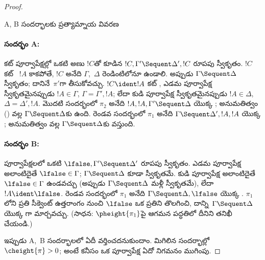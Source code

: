 \documentclass[../../../include/open-logic-section]{subfiles}
\begin{document}
\begin{proof}
\begin{center}
A, B సందర్భాలకు ప్రత్యామ్నాయ వివరణ
\end{center}

\paragraph{సందర్భం A:} కట్ పూర్వాపేక్షల్లో ఒకటి అణు $!C$తో కూడిన $!C, \Gamma' \Sequent \Delta', !C$ రూపపు స్వీకృతం. $!C$ కట్ ~$!A$ కాకపోతే, $!C$ అనేది $\Gamma$,~$\Delta$ రెండింటిలోనూ ఉండాలి. అప్పుడు $\Gamma \Sequent \Delta$ స్వీకృతం; దానినే~$\pi'$గా తీసుకోవచ్చు. $!C \ident !A$ కట్ , ఎడమ పూర్వాపేక్ష స్వీకృతమైనప్పుడు $!A \in \Gamma$, $\Gamma = \Gamma', !A$; లేదా కుడి పూర్వాపేక్ష స్వీకృతమైనప్పుడు $!A \in \Delta$, $\Delta = \Delta', !A$. మొదటి సందర్భంలో $\pi_2$ అనేది $!A, !A, \Gamma' \Sequent \Delta$ యొక్క ; \LeftR{\Contraction} అనుమతిత్వం () వల్ల $\Gamma \Sequent \Delta$కు  ఉంది. రెండవ సందర్భంలో $\pi_1$ అనేది $\Gamma \Sequent \Delta', !A, !A$ యొక్క ; \RightR{\Contraction} అనుమతిత్వం వల్ల $\Gamma \Sequent \Delta$కు  వస్తుంది.

\paragraph{సందర్భం B:} పూర్వాపేక్షలలో ఒకటి $\lfalse, \Gamma' \Sequent \Delta'$ రూపపు స్వీకృతం. ఎడమ పూర్వాపేక్ష అలాంటిదైతే $\lfalse \in \Gamma$; $\Gamma \Sequent \Delta$ కూడా స్వీకృతమే. కుడి పూర్వాపేక్ష అలాంటిదైతే $\lfalse \in \Gamma$ ఉండవచ్చు (అప్పుడు $\Gamma \Sequent \Delta$ మళ్లీ స్వీకృతమే), లేదా $!A \ident \lfalse$. రెండవ సందర్భంలో $\pi_1$ అనేది $\Gamma \Sequent \Delta, \lfalse$ యొక్క . $\pi_1$లోని ప్రతి సీక్వెంట్ ఉత్తరాంగం నుంచి $\lfalse$ ఒక ప్రతిని తొలగించి, దాన్ని~$\Gamma \Sequent \Delta$ యొక్క గా మార్చవచ్చు. (సాధన: $\pheight{\pi_1}$పై ఆగమన పద్ధతిలో దీనిని తనిఖీ చేయండి.)

ఇప్పుడు A,~B సందర్భాలలో ఏదీ వర్తించదనుకుందాం. మిగిలిన సందర్భాల్లో $\cheight{\pi} > 0$; అంటే కనీసం ఒక పూర్వాపేక్ష ఏదో నిగమనం ముగింపు.


\end{proof}
\end{document}
